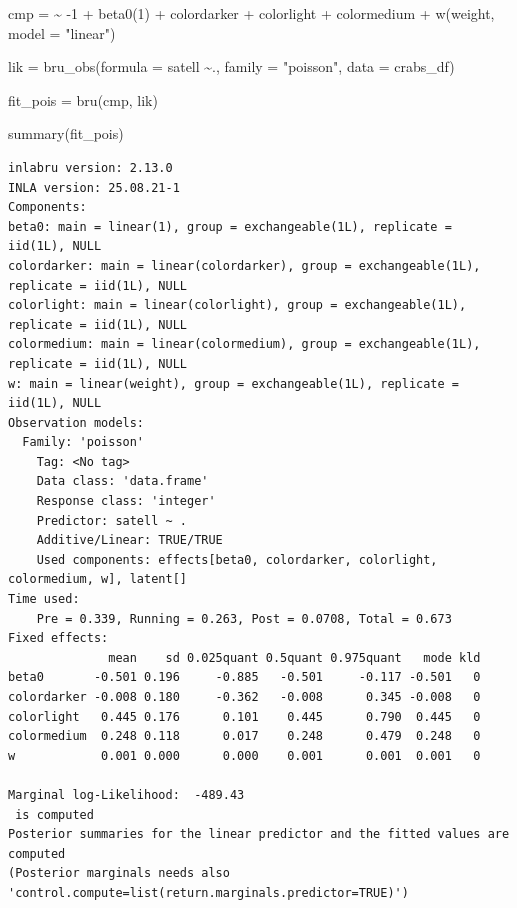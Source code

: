\documentclass[
  letterpaper,
  DIV=11,
  numbers=noendperiod]{scrartcl}
\newenvironment{Shaded}{\begin{snugshade}}{\end{snugshade}}
\newcommand{\AttributeTok}[1]{\textcolor[rgb]{0.40,0.45,0.13}{#1}}
\newcommand{\DecValTok}[1]{\textcolor[rgb]{0.68,0.00,0.00}{#1}}
\newcommand{\ErrorTok}[1]{\textcolor[rgb]{0.68,0.00,0.00}{#1}}
\newcommand{\FunctionTok}[1]{\textcolor[rgb]{0.28,0.35,0.67}{#1}}
\newcommand{\NormalTok}[1]{\textcolor[rgb]{0.00,0.23,0.31}{#1}}
\newcommand{\OtherTok}[1]{\textcolor[rgb]{0.00,0.23,0.31}{#1}}
\newcommand{\SpecialCharTok}[1]{\textcolor[rgb]{0.37,0.37,0.37}{#1}}
\newcommand{\StringTok}[1]{\textcolor[rgb]{0.13,0.47,0.30}{#1}}
\begin{document}
\begin{Shaded}
\begin{Highlighting}[]
\NormalTok{cmp }\OtherTok{=}  \ErrorTok{\textasciitilde{}} \SpecialCharTok{{-}}\DecValTok{1} \SpecialCharTok{+} \FunctionTok{beta0}\NormalTok{(}\DecValTok{1}\NormalTok{) }\SpecialCharTok{+}\NormalTok{  colordarker }\SpecialCharTok{+}
\NormalTok{       colorlight }\SpecialCharTok{+}\NormalTok{ colormedium }\SpecialCharTok{+}
       \FunctionTok{w}\NormalTok{(weight, }\AttributeTok{model =} \StringTok{"linear"}\NormalTok{)}

\NormalTok{lik }\OtherTok{=}  \FunctionTok{bru\_obs}\NormalTok{(}\AttributeTok{formula =}\NormalTok{ satell }\SpecialCharTok{\textasciitilde{}}\NormalTok{.,}
            \AttributeTok{family =} \StringTok{"poisson"}\NormalTok{,}
            \AttributeTok{data =}\NormalTok{ crabs\_df)}

\NormalTok{fit\_pois }\OtherTok{=} \FunctionTok{bru}\NormalTok{(cmp, lik)}

\FunctionTok{summary}\NormalTok{(fit\_pois)}
\end{Highlighting}
\end{Shaded}

\begin{verbatim}
inlabru version: 2.13.0
INLA version: 25.08.21-1
Components:
beta0: main = linear(1), group = exchangeable(1L), replicate = iid(1L), NULL
colordarker: main = linear(colordarker), group = exchangeable(1L), replicate = iid(1L), NULL
colorlight: main = linear(colorlight), group = exchangeable(1L), replicate = iid(1L), NULL
colormedium: main = linear(colormedium), group = exchangeable(1L), replicate = iid(1L), NULL
w: main = linear(weight), group = exchangeable(1L), replicate = iid(1L), NULL
Observation models:
  Family: 'poisson'
    Tag: <No tag>
    Data class: 'data.frame'
    Response class: 'integer'
    Predictor: satell ~ .
    Additive/Linear: TRUE/TRUE
    Used components: effects[beta0, colordarker, colorlight, colormedium, w], latent[]
Time used:
    Pre = 0.339, Running = 0.263, Post = 0.0708, Total = 0.673 
Fixed effects:
              mean    sd 0.025quant 0.5quant 0.975quant   mode kld
beta0       -0.501 0.196     -0.885   -0.501     -0.117 -0.501   0
colordarker -0.008 0.180     -0.362   -0.008      0.345 -0.008   0
colorlight   0.445 0.176      0.101    0.445      0.790  0.445   0
colormedium  0.248 0.118      0.017    0.248      0.479  0.248   0
w            0.001 0.000      0.000    0.001      0.001  0.001   0

Marginal log-Likelihood:  -489.43 
 is computed 
Posterior summaries for the linear predictor and the fitted values are computed
(Posterior marginals needs also 'control.compute=list(return.marginals.predictor=TRUE)')
\end{verbatim}
\end{document}
